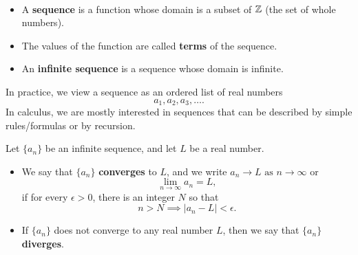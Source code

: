 \setcounter{chapter}{10}
\setcounter{section}{1}
\setcounter{theorem}{0}
\setcounter{equation}{0}


\begin{definition}\,
\begin{itemize}
\item A \textbf{sequence} is a function whose domain is a subset of $\mathbb Z$ (the set of whole numbers).
\item The values of the function are called \textbf{terms} of the sequence.
\item An \textbf{infinite sequence} is a sequence whose domain is infinite.
\end{itemize}
\end{definition}

\begin{remark}
In practice, we view a sequence as an ordered list of real numbers
\begin{equation*}
a_1, a_2, a_3,\dots.
\end{equation*}
In calculus, we are mostly interested in sequences that can be described by simple rules/formulas or by recursion.
\end{remark}

\begin{definition}
Let $\{a_n\}$ be an infinite sequence, and let $L$ be a real number.
\begin{itemize}
\item We say that $\{a_n\}$ \textbf{converges} to $L$, and we write $a_n\to L \text{ as } n\to\infty$ or
\begin{equation*}
\lim_{n\to\infty}a_n = L,
\end{equation*}
if for every $\epsilon>0$, there is an integer $N$ so that
\begin{equation*}
n>N \implies |a_n - L|<\epsilon.
\end{equation*}
\item If $\{a_n\}$ does not converge to any real number $L$, then we say that $\{a_n\}$ \textbf{diverges}.
\end{itemize}
\end{definition}

